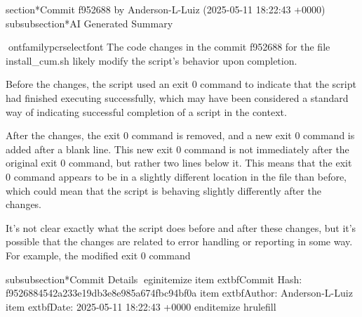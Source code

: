 \documentclass{article}
\begin{document}
section*{Commit f952688 by Anderson-L-Luiz (2025-05-11 18:22:43 +0000)}
subsubsection*{AI Generated Summary}
{ontfamily{pcr}selectfont
 The code changes in the commit f952688 for the file install_cum.sh likely modify the script's behavior upon completion.

Before the changes, the script used an exit 0 command to indicate that the script had finished executing successfully, which may have been considered a standard way of indicating successful completion of a script in the context.

After the changes, the exit 0 command is removed, and a new exit 0 command is added after a blank line. This new exit 0 command is not immediately after the original exit 0 command, but rather two lines below it. This means that the exit 0 command appears to be in a slightly different location in the file than before, which could mean that the script is behaving slightly differently after the changes.

It's not clear exactly what the script does before and after these changes, but it's possible that the changes are related to error handling or reporting in some way. For example, the modified exit 0 command
}
subsubsection*{Commit Details}
egin{itemize}
    item 	extbf{Commit Hash:} f9526884542a233e19db3e8e985a674fbc94bf0a
    item 	extbf{Author:} Anderson-L-Luiz
    item 	extbf{Date:} 2025-05-11 18:22:43 +0000
end{itemize}
hrulefill
\end{document}
